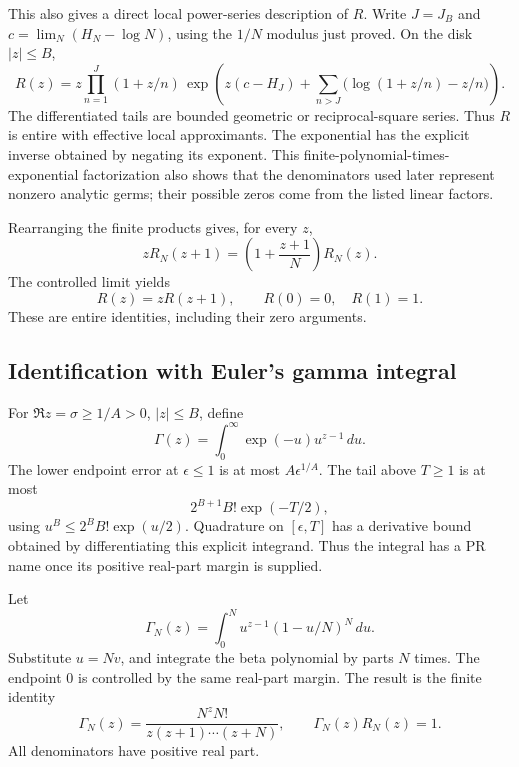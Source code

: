 \documentclass[11pt,letterpaper]{article}
\numberwithin{equation}{section}
\theoremstyle{definition}
\newcommand{\gamrec}{R}
\begin{document}
This also gives a direct local power-series description of \(\gamrec\).
Write \(J=J_B\) and \(c=\lim_N(H_N-\log N)\), using the \(1/N\)
modulus just proved. On the disk \(|z|\le B\),
\begin{equation}
 \gamrec(z)=z\prod_{n=1}^{J}(1+z/n)\,
 \exp\left(z(c-H_J)+
        \sum_{n>J}\bigl(\log(1+z/n)-z/n\bigr)\right).
 \label{eq:Rlocalfactor}
\end{equation}
The differentiated tails are bounded geometric or reciprocal-square
series. Thus \(\gamrec\) is entire with effective local approximants.
The exponential has the explicit inverse obtained by negating its
exponent. This finite-polynomial-times-exponential factorization
also shows that the denominators used later represent nonzero
analytic germs; their possible zeros come from the listed linear factors.

Rearranging the finite products gives, for every \(z\),
\begin{equation}
 z\gamrec_N(z+1)=\left(1+\frac{z+1}{N}\right)\gamrec_N(z).
\end{equation}
The controlled limit yields
\begin{equation}
 \gamrec(z)=z\gamrec(z+1),\qquad \gamrec(0)=0,\quad\gamrec(1)=1.
 \label{eq:Rrecurrence}
\end{equation}
These are entire identities, including their zero arguments.

\subsection{Identification with Euler's gamma integral}

For \(\Re z=\sigma\ge1/A>0\), \(|z|\le B\), define
\[
                  \Gamma(z)=\int_0^\infty \exp(-u)u^{z-1}\,du.
\]
The lower endpoint error at \(\epsilon\le1\) is at most
\(A\epsilon^{1/A}\). The tail above \(T\ge1\) is at most
\begin{equation}
                  2^{B+1}B!\exp(-T/2),                   \label{eq:gammaintegraltail}
\end{equation}
using \(u^B\le2^BB!\exp(u/2)\). Quadrature on
\([\epsilon,T]\) has a derivative bound obtained by differentiating
this explicit integrand. Thus the integral has a PR name once its
positive real-part margin is supplied.

Let
\[
 \Gamma_N(z)=\int_0^N u^{z-1}(1-u/N)^N\,du.
\]
Substitute \(u=Nv\), and integrate the beta polynomial by parts \(N\)
times. The endpoint \(0\) is controlled by the same real-part margin.
The result is the finite identity
\begin{equation}
 \Gamma_N(z)=
 \frac{N^zN!}{z(z+1)\cdots(z+N)},\qquad
                  \Gamma_N(z)\gamrec_N(z)=1.              \label{eq:betaEuler}
\end{equation}
All denominators have positive real part.
\end{document}
